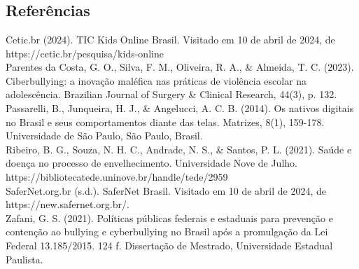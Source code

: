 \chapter{}

\section{Referências}

Cetic.br (2024). TIC Kids Online Brasil. Visitado em 10 de abril de 2024, de\\ https://cetic.br/pesquisa/kids-online \\

Parentes da Costa, G. O., Silva, F. M., Oliveira, R. A., & Almeida, T. C. (2023). Ciberbullying: a inovação maléfica nas práticas de violência escolar na adolescência. Brazilian Journal of Surgery & Clinical Research, 44(3), p. 132. \\

Passarelli, B., Junqueira, H. J., & Angelucci, A. C. B. (2014). Os nativos digitais no Brasil e seus comportamentos diante das telas. Matrizes, 8(1), 159-178. Universidade de São Paulo, São Paulo, Brasil. \\

Ribeiro, B. G., Souza, N. H. C., Andrade, N. S., & Santos, P. L. (2021). Saúde e doença no processo de envelhecimento. Universidade Nove de Julho. \\https://bibliotecatede.uninove.br/handle/tede/2959 \\

SaferNet.org.br (s.d.). SaferNet Brasil. Visitado em 10 de abril de 2024, de \\https://new.safernet.org.br/. \\

Zafani, G. S. (2021). Políticas públicas federais e estaduais para prevenção e contenção ao bullying e cyberbullying no Brasil após a promulgação da Lei Federal 13.185/2015. 124 f. Dissertação de Mestrado, Universidade Estadual Paulista.

